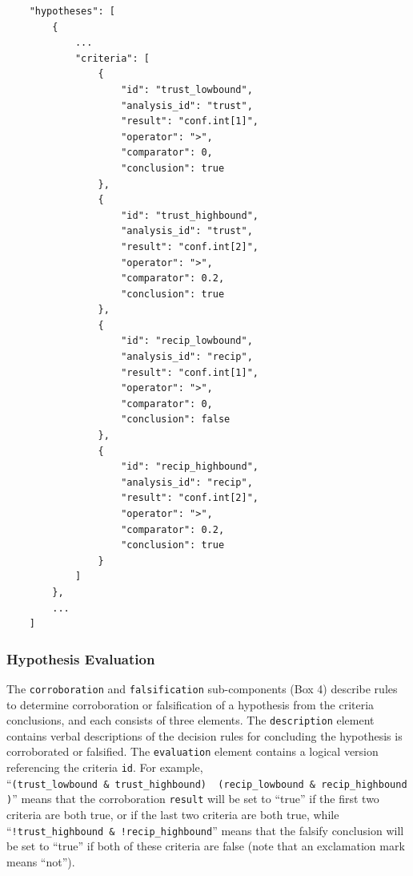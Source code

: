 \documentclass[english,doc,floatsintext]{apa6}
\begin{document}
\begin{tcolorbox}[colback=black!5!white,colframe=white!5!black,title=Box 3. Criteria for evaluation.]
\begin{verbatim}
    "hypotheses": [
        {
            ...
            "criteria": [
                {
                    "id": "trust_lowbound",
                    "analysis_id": "trust",
                    "result": "conf.int[1]",
                    "operator": ">",
                    "comparator": 0,
                    "conclusion": true
                },
                {
                    "id": "trust_highbound",
                    "analysis_id": "trust",
                    "result": "conf.int[2]",
                    "operator": ">",
                    "comparator": 0.2,
                    "conclusion": true
                },
                {
                    "id": "recip_lowbound",
                    "analysis_id": "recip",
                    "result": "conf.int[1]",
                    "operator": ">",
                    "comparator": 0,
                    "conclusion": false
                },
                {
                    "id": "recip_highbound",
                    "analysis_id": "recip",
                    "result": "conf.int[2]",
                    "operator": ">",
                    "comparator": 0.2,
                    "conclusion": true
                }
            ]
        },
        ...
    ]
\end{verbatim}
\end{tcolorbox}

\hypertarget{hypothesis-evaluation}{%
\subsubsection{Hypothesis Evaluation}\label{hypothesis-evaluation}}

The \texttt{corroboration} and \texttt{falsification} sub-components (Box 4) describe rules to determine corroboration or falsification of a hypothesis from the criteria conclusions, and each consists of three elements. The \texttt{description} element contains verbal descriptions of the decision rules for concluding the hypothesis is corroborated or falsified. The \texttt{evaluation} element contains a logical version referencing the criteria \texttt{id}. For example, \enquote{\texttt{(trust\_lowbound\ \&\ trust\_highbound)\ \textbar{}\ (recip\_lowbound\ \&\ recip\_highbound)}} means that the corroboration \texttt{result} will be set to \enquote{true} if the first two criteria are both true, or if the last two criteria are both true, while \enquote{\texttt{!trust\_highbound\ \&\ !recip\_highbound}} means that the falsify conclusion will be set to \enquote{true} if both of these criteria are false (note that an exclamation mark means \enquote{not}).
\end{document}

